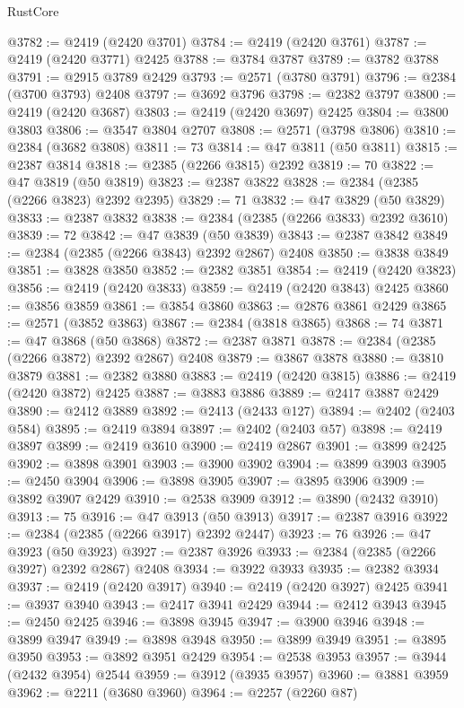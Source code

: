 \begin{lexlean}{RustCore}
\begin{coremodule}
@3782 := @2419 (@2420 @3701)
@3784 := @2419 (@2420 @3761)
@3787 := @2419 (@2420 @3771) @2425
@3788 := @3784 @3787
@3789 := @3782 @3788
@3791 := @2915 @3789 @2429
@3793 := @2571 (@3780 @3791)
@3796 := @2384 (@3700 @3793) @2408
@3797 := @3692 @3796
@3798 := @2382 @3797
@3800 := @2419 (@2420 @3687)
@3803 := @2419 (@2420 @3697) @2425
@3804 := @3800 @3803
@3806 := @3547 @3804 @2707
@3808 := @2571 (@3798 @3806)
@3810 := @2384 (@3682 @3808)
@3811 := 73
@3814 := @47 @3811 (@50 @3811)
@3815 := @2387 @3814
@3818 := @2385 (@2266 @3815) @2392
@3819 := 70
@3822 := @47 @3819 (@50 @3819)
@3823 := @2387 @3822
@3828 := @2384 (@2385 (@2266 @3823) @2392 @2395)
@3829 := 71
@3832 := @47 @3829 (@50 @3829)
@3833 := @2387 @3832
@3838 := @2384 (@2385 (@2266 @3833) @2392 @3610)
@3839 := 72
@3842 := @47 @3839 (@50 @3839)
@3843 := @2387 @3842
@3849 := @2384 (@2385 (@2266 @3843) @2392 @2867) @2408
@3850 := @3838 @3849
@3851 := @3828 @3850
@3852 := @2382 @3851
@3854 := @2419 (@2420 @3823)
@3856 := @2419 (@2420 @3833)
@3859 := @2419 (@2420 @3843) @2425
@3860 := @3856 @3859
@3861 := @3854 @3860
@3863 := @2876 @3861 @2429
@3865 := @2571 (@3852 @3863)
@3867 := @2384 (@3818 @3865)
@3868 := 74
@3871 := @47 @3868 (@50 @3868)
@3872 := @2387 @3871
@3878 := @2384 (@2385 (@2266 @3872) @2392 @2867) @2408
@3879 := @3867 @3878
@3880 := @3810 @3879
@3881 := @2382 @3880
@3883 := @2419 (@2420 @3815)
@3886 := @2419 (@2420 @3872) @2425
@3887 := @3883 @3886
@3889 := @2417 @3887 @2429
@3890 := @2412 @3889
@3892 := @2413 (@2433 @127)
@3894 := @2402 (@2403 @584)
@3895 := @2419 @3894
@3897 := @2402 (@2403 @57)
@3898 := @2419 @3897
@3899 := @2419 @3610
@3900 := @2419 @2867
@3901 := @3899 @2425
@3902 := @3898 @3901
@3903 := @3900 @3902
@3904 := @3899 @3903
@3905 := @2450 @3904
@3906 := @3898 @3905
@3907 := @3895 @3906
@3909 := @3892 @3907 @2429
@3910 := @2538 @3909
@3912 := @3890 (@2432 @3910)
@3913 := 75
@3916 := @47 @3913 (@50 @3913)
@3917 := @2387 @3916
@3922 := @2384 (@2385 (@2266 @3917) @2392 @2447)
@3923 := 76
@3926 := @47 @3923 (@50 @3923)
@3927 := @2387 @3926
@3933 := @2384 (@2385 (@2266 @3927) @2392 @2867) @2408
@3934 := @3922 @3933
@3935 := @2382 @3934
@3937 := @2419 (@2420 @3917)
@3940 := @2419 (@2420 @3927) @2425
@3941 := @3937 @3940
@3943 := @2417 @3941 @2429
@3944 := @2412 @3943
@3945 := @2450 @2425
@3946 := @3898 @3945
@3947 := @3900 @3946
@3948 := @3899 @3947
@3949 := @3898 @3948
@3950 := @3899 @3949
@3951 := @3895 @3950
@3953 := @3892 @3951 @2429
@3954 := @2538 @3953
@3957 := @3944 (@2432 @3954) @2544
@3959 := @3912 (@3935 @3957)
@3960 := @3881 @3959
@3962 := @2211 (@3680 @3960)
@3964 := @2257 (@2260 @87)

\end{coremodule}
\end{lexlean}
